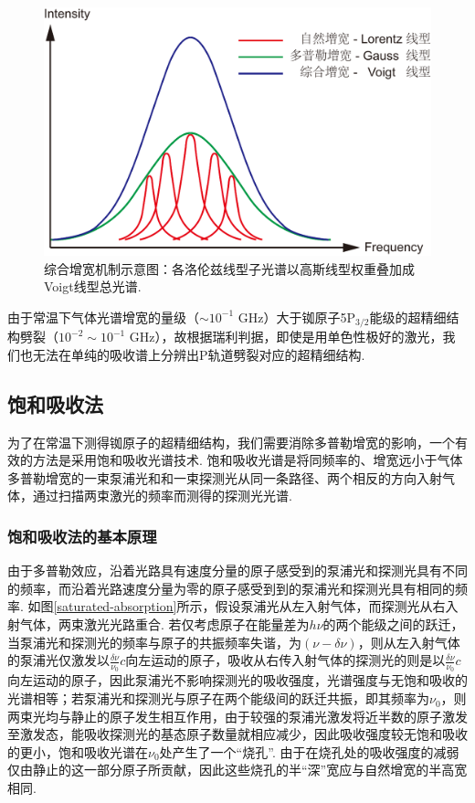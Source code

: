 \documentclass[a4paper, 10pt]{article}
\begin{document}
\begin{multicols*}{2}
\begin{figure}[H]
    \centering
    \includegraphics[width=.9\columnwidth]{Broadening.pdf}
    \caption{综合增宽机制示意图：各洛伦兹线型子光谱以高斯线型权重叠加成Voigt线型总光谱.}
    \label{broadening}
\end{figure}

由于常温下气体光谱增宽的量级（$\sim 10^{-1}$ GHz）大于铷原子5P$_{3/2}$能级的超精细结构劈裂（$10^{-2}\sim 10^{-1}$ GHz），故根据瑞利判据，即使是用单色性极好的激光，我们也无法在单纯的吸收谱上分辨出P轨道劈裂对应的超精细结构.

\subsection{饱和吸收法}
为了在常温下测得铷原子的超精细结构，我们需要消除多普勒增宽的影响，一个有效的方法是采用饱和吸收光谱技术. 饱和吸收光谱是将同频率的、增宽远小于气体多普勒增宽的一束泵浦光和和一束探测光从同一条路径、两个相反的方向入射气体，通过扫描两束激光的频率而测得的探测光光谱.

\subsubsection{饱和吸收法的基本原理}
由于多普勒效应，沿着光路具有速度分量的原子感受到的泵浦光和探测光具有不同的频率，而沿着光路速度分量为零的原子感受到到的泵浦光和探测光具有相同的频率. 如图\ref{saturated-absorption}所示，假设泵浦光从左入射气体，而探测光从右入射气体，两束激光光路重合. 若仅考虑原子在能量差为$h\nu$的两个能级之间的跃迁，当泵浦光和探测光的频率与原子的共振频率失谐，为$(\nu-\delta\nu)$，则从左入射气体的泵浦光仅激发以$\frac{\delta\nu}{\nu_0}c$向左运动的原子，吸收从右传入射气体的探测光的则是以$\frac{\delta\nu}{\nu_0}c$向左运动的原子，因此泵浦光不影响探测光的吸收强度，光谱强度与无饱和吸收的光谱相等；若泵浦光和探测光与原子在两个能级间的跃迁共振，即其频率为$\nu_0$，则两束光均与静止的原子发生相互作用，由于较强的泵浦光激发将近半数的原子激发至激发态，能吸收探测光的基态原子数量就相应减少，因此吸收强度较无饱和吸收的更小，饱和吸收光谱在$\nu_0$处产生了一个“烧孔”. 由于在烧孔处的吸收强度的减弱仅由静止的这一部分原子所贡献，因此这些烧孔的半“深”宽应与自然增宽的半高宽相同.


\end{multicols*}
\end{document}
